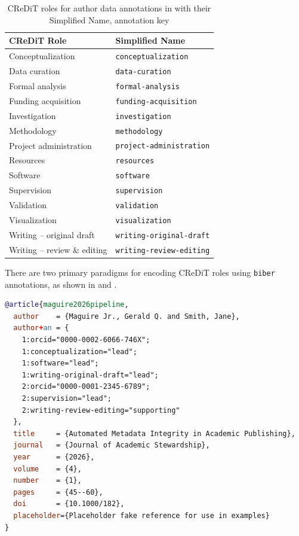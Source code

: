 \documentclass[12pt, twoside]{article}
\begin{document}
\begin{table}[!htp]
  \centering
  \caption{CReDiT roles for author data annotations in \BibLaTeX with their Simplified Name, \ie annotation key }
  \label{tab:CReDiT_annotation}
  \begin{tabular}{L{5.5cm} L{8.5cm}}
    \hline
    \textbf{CReDiT Role} & \textbf{Simplified Name} \\
    \hline
    Conceptualization          & \texttt{conceptualization} \\
    Data curation              & \texttt{data-curation} \\
    Formal analysis            & \texttt{formal-analysis}\\
    Funding acquisition        & \texttt{funding-acquisition} \\
    Investigation              & \texttt{investigation}\\
    Methodology                & \texttt{methodology} \\
    Project administration     & \texttt{project-administration} \\
    Resources                  & \texttt{resources} \\
    Software                   & \texttt{software} \\
    Supervision                & \texttt{supervision} \\
    Validation                 & \texttt{validation} \\
    Visualization              & \texttt{visualization} \\
    Writing -- original draft  & \texttt{writing-original-draft} \\
    Writing -- review \& editing & \texttt{writing-review-editing}\\
    \hline
  \end{tabular}
\end{table}
\FloatBarrier

There are two primary paradigms for encoding \gls{CReDiT} roles using \texttt{biber} annotations, as shown in  and .

\begin{lstlisting}[language={BibTeX}, breaklines=true, basicstyle=\small\ttfamily, caption={{Pattern A: Role-as-Key (Fine-grained with degrees of contribution)}}, label=lst:biberCreditPatternA]
@article{maguire2026pipeline,
  author    = {Maguire Jr., Gerald Q. and Smith, Jane},
  author+an = {
    1:orcid="0000-0002-6066-746X";
    1:conceptualization="lead";
    1:software="lead";
    1:writing-original-draft="lead";
    2:orcid="0000-0001-2345-6789";
    2:supervision="lead";
    2:writing-review-editing="supporting"
  },
  title     = {Automated Metadata Integrity in Academic Publishing},
  journal   = {Journal of Academic Stewardship},
  year      = {2026},
  volume    = {4},
  number    = {1},
  pages     = {45--60},
  doi       = {10.1000/182},
  placeholder={Placeholder fake reference for use in examples}
}
\end{lstlisting}
\end{document}
